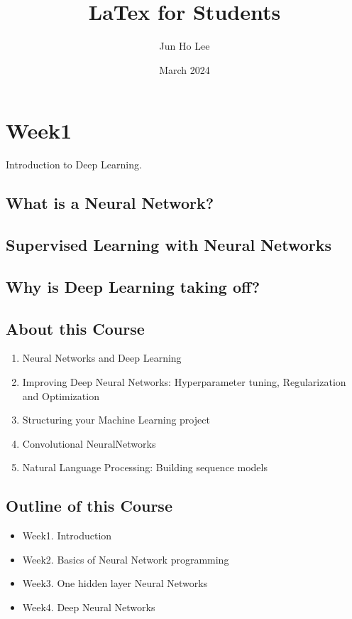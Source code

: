 \documentclass{article}
\title{LaTex for Students}
\author{Jun Ho Lee}
\date{March 2024}
\begin{document}
\newpage

\section{Week1}

    Introduction to Deep Learning.

\subsection{What is a Neural Network?}

\subsection{Supervised Learning with Neural Networks}

\subsection{Why is Deep Learning taking off?}

\subsection{About this Course}
    \begin{enumerate}
        \item Neural Networks and Deep Learning
        \item Improving Deep Neural Networks: Hyperparameter  tuning, Regularization and Optimization
        \item Structuring your Machine Learning project
        \item Convolutional NeuralNetworks
        \item Natural Language Processing: Building sequence models
    \end{enumerate}

\subsection{Outline of this Course}
    \begin{itemize}
        \item{Week1. Introduction}
        \item{Week2. Basics of Neural Network programming}
        \item{Week3. One hidden layer Neural Networks}
        \item{Week4. Deep Neural Networks}
    \end{itemize}
\end{document}
